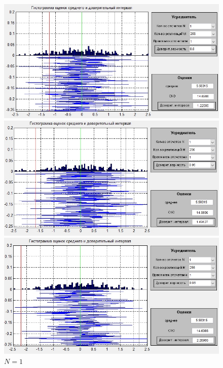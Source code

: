 \begin{figure}[H]
	\begin{minipage}{0.3\linewidth}
		\centering
		\includegraphics[width=\linewidth]{tasks/task6/realize_b1N1}
		\caption*{$\beta =0.8$}
	\end{minipage}
	\begin{minipage}{0.3\linewidth}
		\centering
		\includegraphics[width=\linewidth]{tasks/task6/realize_b2N1}
		\caption*{$\beta =0.95$}
	\end{minipage}
	\begin{minipage}{0.3\linewidth}
		\centering
		\includegraphics[width=\linewidth]{tasks/task6/realize_b3N1}
		\caption*{$\beta =0.98$}
	\end{minipage}
\caption*{$N=1$}
\end{figure}

